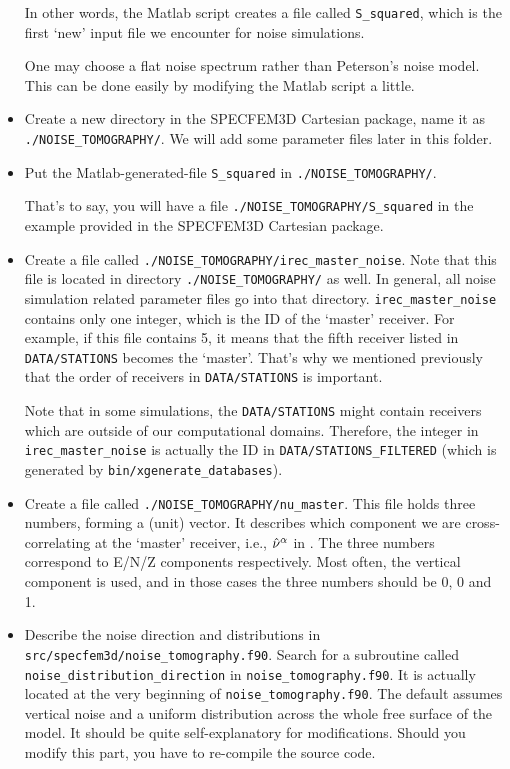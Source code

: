 \begin{itemize}
In other words, the Matlab script creates a file called \texttt{S\_squared},
which is the first `new' input file we encounter for noise simulations.

One may choose a flat noise spectrum rather than Peterson's noise
model. This can be done easily by modifying the Matlab script a little.

\item Create a new directory in the SPECFEM3D Cartesian package, name it
as \texttt{./NOISE\_TOMOGRAPHY/}. We will add some parameter
files later in this folder.

\item Put the Matlab-generated-file \texttt{S\_squared} in \texttt{./NOISE\_TOMOGRAPHY/}.

That's to say, you will have a file \texttt{./NOISE\_TOMOGRAPHY/S\_squared}
in the example provided in the SPECFEM3D Cartesian package.

\item Create a file called \texttt{./NOISE\_TOMOGRAPHY/irec\_master\_noise}.
Note that this file is located in directory \texttt{./NOISE\_TOMOGRAPHY/}
as well. In general, all noise simulation related parameter files
go into that directory. \texttt{irec\_master\_noise} contains only
one integer, which is the ID of the `master' receiver. For example,
if this file contains 5, it means that the fifth receiver listed in
\texttt{DATA/STATIONS} becomes the `master'. That's why we mentioned
previously that the order of receivers in \texttt{DATA/STATIONS} is
important.


Note that in some simulations, the \texttt{DATA/STATIONS} might
contain receivers which are outside of our computational domains.
Therefore, the integer in \texttt{irec\_master\_noise} is actually
the ID in \texttt{DATA/STATIONS\_FILTERED} (which is generated by
\texttt{bin/xgenerate\_databases}).

\item Create a file called \texttt{./NOISE\_TOMOGRAPHY/nu\_master}.
This file holds three numbers, forming a (unit) vector. It describes
which component we are cross-correlating at the `master' receiver,
i.e., ${\hat{{\bf \nu}}}^{\alpha}$ in \citet{trompetal2010}. The
three numbers correspond to E/N/Z components respectively. Most often,
the vertical component is used, and in those cases the three numbers
should be 0, 0 and 1.

\item Describe the noise direction and distributions in \texttt{src/specfem3d/noise\_tomography.f90}.
Search for a subroutine called \texttt{noise\_distribution\_direction}
in \texttt{noise\_tomography.f90}. It is actually located at the very
beginning of \texttt{noise\_tomography.f90}. The default assumes vertical
noise and a uniform distribution across the whole free surface of
the model. It should be quite self-explanatory for modifications.
Should you modify this part, you have to re-compile the source code.
\end{itemize}

